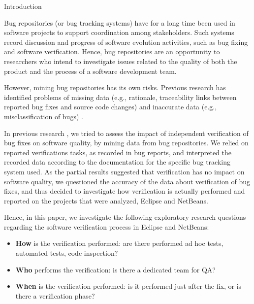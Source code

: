 \begin{section}{Introduction}

Bug repositories (or bug tracking systems) have for a long time been used in software projects to support coordination among stakeholders. Such systems record discussion and progress of software evolution activities, such as bug fixing and software verification. Hence, bug repositories are an opportunity to researchers who intend to investigate issues related to the quality of both the product and the process of a software development team.


However, mining bug repositories has its own risks. Previous research has identified problems of missing data (e.g., rationale, traceability links between reported bug fixes and source code changes) and inaccurate data (e.g., misclassification of bugs) \cite{Aranda2009}. %

  In previous research \cite{Souza2011}, we tried to assess the impact of independent verification of bug fixes on software quality, by mining data from bug repositories. 
  We relied on reported verifications tasks, as recorded in bug reports, and interpreted the recorded data according to the documentation for the specific bug tracking system used.
  As the partial results suggested that verification has no impact on software quality, we questioned the accuracy of the data about verification of bug fixes, and thus decided to investigate how verification is actually performed and reported on the projects that were analyzed, Eclipse and NetBeans.
	
	Hence, in this paper, we investigate the following exploratory research questions regarding the software verification process in Eclipse and NetBeans:

	\begin{itemize}
		\item \textbf{How} is the verification performed: are there performed ad hoc tests, automated tests, code inspection?
		\item \textbf{Who} performs the verification: is there a dedicated team for QA? 
		\item \textbf{When} is the verification performed: is it performed just after the fix, or is there a verification phase?
	\end{itemize}


\end{section}
